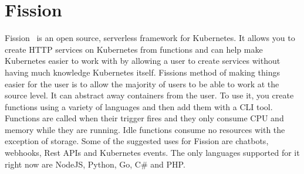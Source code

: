 \section{Fission}
Fission~\cite{hid-sp18-521-FissionBlog} is an open source, serverless
framework for Kubernetes. It allows you to create HTTP services
on Kubernetes from functions and can help make Kubernetes easier
to work with by allowing a user to create services without having
much knowledge Kubernetes itself. Fissions method of making things easier
for the user is to allow the majority of users to be able to work at the
source level. It can abstract away containers from the user. To use 
it, you create functions using a variety of languages and then add them
with a CLI tool. Functions are called when their trigger fires and they
only consume CPU and memory while they are running. Idle functions
consume no resources with the exception of storage. Some of the 
suggested uses for Fission are chatbots, webhooks, Rest APIs and 
Kubernetes events. The only languages supported for it right now
are NodeJS, Python, Go, C# and PHP. 
